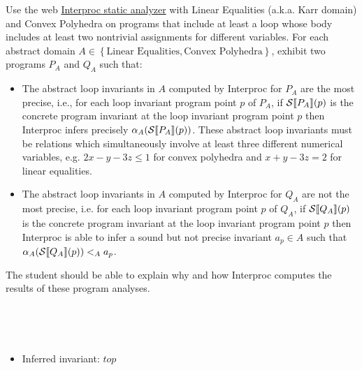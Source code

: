 \begin{exercise}{
    Use the web \href{http://pop-art.inrialpes.fr/interproc/interprocweb.cgi}{Interproc static analyzer} with Linear Equalities (a.k.a. Karr domain) and Convex Polyhedra on programs that include at least a loop whose body includes at least two nontrivial assignments for different variables. For each abstract domain  $A \in \left\{\text{Linear Equalities}, \text{Convex Polyhedra}\right\}$, exhibit two programs $P_A$ and $Q_A$ such that:
    \begin{itemize}
        \item The abstract loop invariants in $A$ computed by Interproc for $P_A$ are the most precise, i.e., for each loop invariant program point $p$ of $P_A$, if $\mathcal{S} \llbracket P_A \rrbracket(p)$ is the concrete program invariant at the loop invariant program point $p$ then Interproc infers precisely $\alpha_A(\mathcal{S} \llbracket P_A \rrbracket(p))$. These abstract loop invariants must be relations which simultaneously involve at least three different numerical variables, e.g. $2x - y -3z \leq 1$ for convex polyhedra and $x + y - 3z = 2$ for linear equalities.
        \item The abstract loop invariants in $A$ computed by Interproc for $Q_A$ are not the most precise, i.e. for each loop invariant program point $p$ of $Q_A$, if $\mathcal{S} \llbracket Q_A \rrbracket(p)$ is the concrete program invariant at the loop invariant program point $p$ then Interproc is able to infer a sound but not precise invariant $a_p \in A$ such that $\alpha_A(\mathcal{S} \llbracket Q_A \rrbracket(p)) <_A a_p$.
    \end{itemize}
    The student should be able to explain why and how Interproc computes the results of these program analyses.
}
    \newcommand{\program}[3]{
        \begin{minipage}[t]{.48\textwidth}
            \centering
            
        \end{minipage}
        \hfill
        \begin{minipage}[t]{.48\textwidth}
            \vspace*{1cm}
            #3
        \end{minipage}
        \\
    }
    \vspace*{-0.6cm}\\
    \program{p_le.simple}{P_\text{Linear Equalities}}{}
    \program{q_le.simple}{Q_\text{Linear Equalities}}{
        \begin{itemize}
            \item Inferred invariant: $top$

\end{itemize}}
\end{exercise}
